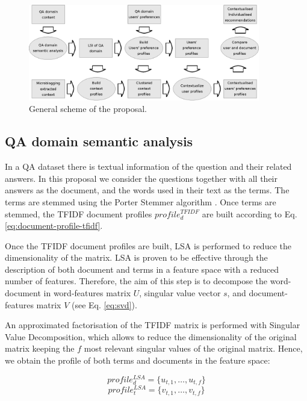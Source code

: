 \documentclass[preprint]{elsarticle}
\begin{document}
\begin{spacing}{1.5}
\begin{figure}[h]
	\centering
	\includegraphics[width=0.9\textwidth]{figures/proposal-scheme.eps}
	\caption{General scheme of the proposal.}
	\label{fig:proposal-scheme}
\end{figure}

\subsection{QA domain semantic analysis}

In a QA dataset there is textual information of the question and their related answers. In this proposal we consider the questions together with all their answers as the document, and the words used in their text as the terms. The terms are stemmed using the Porter Stemmer algorithm \citep{Porter1980}. Once terms are stemmed, the TFIDF document profiles $profile^{TFIDF}_{d}$ are built according to Eq. \ref{eq:document-profile-tfidf}.

Once the TFIDF document profiles are built, LSA is performed to reduce the dimensionality of the matrix. LSA is proven to be effective through the description of both document and terms in a feature space with a reduced number of features. Therefore, the aim of this step is to decompose the word-document in word-features matrix $U$, singular value vector $s$, and document-features matrix $V$ (see Eq. \ref{eq:svd}).

An approximated factorisation of the TFIDF matrix is performed with Singular Value Decomposition, which allows to reduce the dimensionality of the original matrix keeping the $f$ most relevant singular values of the original matrix. Hence, we obtain the profile of both terms and documents in the feature space:

\begin{equation}
	profile^{LSA}_d = \{ u_{t,1},\dots, u_{t,f}\}
\end{equation}
\begin{equation}
	profile^{LSA}_t = \{ v_{t,1},\dots, v_{t,f}\}
\end{equation}


\end{spacing}
\end{document}
